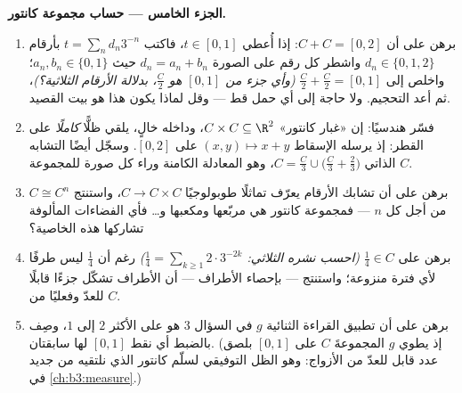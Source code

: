 \begin{problem}
\medskip
\noindent\textbf{الجزء الخامس --- حساب مجموعة كانتور.}
\begin{enumerate}[resume]
  \item برهن على أن $C + C = [0, 2]$: إذا أُعطي $t \in [0, 1]$،
        فاكتب $t = \sum_n d_n3^{-n}$ بأرقام $d_n \in \{0,
        1, 2\}$ واشطر كل رقم على الصورة
        $d_n = a_n + b_n$ حيث $a_n, b_n \in \{0, 1\}$؛ واخلص إلى $\frac C2 +
        \frac C2 = [0, 1]$ \emph{(وأي جزء من
        $[0,1]$ هو $\frac C2$، بدلالة الأرقام الثلاثية؟)}، ثم
        أعد التحجيم. ولا حاجة إلى أي حمل قط --- وقل لماذا يكون
        هذا هو بيت القصيد.
  \item فسّر هندسيًا: إن «غبار كانتور» $C \times
        C \subseteq \R^2$، وداخله خالٍ،
        يلقي ظلًّا \emph{كاملًا} على القطر: إذ يرسله الإسقاط
        $(x,
        y) \mapsto x + y$ على $[0, 2]$. وسجّل أيضًا التشابه الذاتي
        $C = \frac C3 \cup \bigl(\frac C3 +
        \frac23\bigr)$، وهو المعادلة الكامنة وراء كل صورة للمجموعة $C$.
  \item برهن على أن تشابك الأرقام يعرّف تماثلًا طوبولوجيًا
        $C
        \to C \times C$، واستنتج $C \cong C^n$ من أجل كل $n$ --- فمجموعة
        كانتور هي مربّعها ومكعبها و\dots{} فأي الفضاءات المألوفة
        تشاركها هذه الخاصية؟
  \item برهن على $\frac14 \in C$ \emph{(احسب نشره الثلاثي:
        $\frac14 = \sum_{k\geq1} 2\cdot3^{-2k}$)} رغم أن $\frac14$ ليس طرفًا لأي فترة منزوعة؛
        واستنتج --- بإحصاء الأطراف --- أن الأطراف تشكّل جزءًا
        قابلًا للعدّ وفعليًا من $C$.
  \item برهن على أن تطبيق القراءة الثنائية $g$ في السؤال 3 هو
        على الأكثر $2$ إلى $1$، وصِف بالضبط أي نقط $[0,1]$ لها
        سابقتان. (إذ يطوي $g$ المجموعةَ $C$ على $[0,1]$ بلصق
        عدد قابل للعدّ من الأزواج: وهو الظل التوفيقي لسلّم كانتور
        الذي نلتقيه من جديد في \cref{ch:b3:measure}.)
\end{enumerate}


\end{problem}
